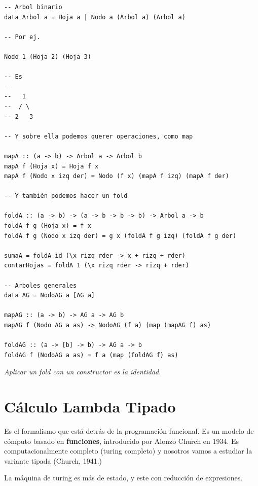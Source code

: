 \documentclass{report}
\theoremstyle{definition} %
\begin{document}
\begin{verbatim}
-- Arbol binario
data Arbol a = Hoja a | Nodo a (Arbol a) (Arbol a)

-- Por ej.

Nodo 1 (Hoja 2) (Hoja 3)

-- Es
--
--   1
--  / \
-- 2   3

-- Y sobre ella podemos querer operaciones, como map

mapA :: (a -> b) -> Arbol a -> Arbol b
mapA f (Hoja x) = Hoja f x
mapA f (Nodo x izq der) = Nodo (f x) (mapA f izq) (mapA f der)

-- Y también podemos hacer un fold

foldA :: (a -> b) -> (a -> b -> b -> b) -> Arbol a -> b
foldA f g (Hoja x) = f x
foldA f g (Nodo x izq der) = g x (foldA f g izq) (foldA f g der)

sumaA = foldA id (\x rizq rder -> x + rizq + rder)
contarHojas = foldA 1 (\x rizq rder -> rizq + rder)

-- Arboles generales
data AG = NodoAG a [AG a]

mapAG :: (a -> b) -> AG a -> AG b
mapAG f (Nodo AG a as) -> NodoAG (f a) (map (mapAG f) as)

foldAG :: (a -> [b] -> b) -> AG a -> b
foldAG f (NodoAG a as) = f a (map (foldAG f) as)
\end{verbatim}

\textit{Aplicar un fold con un constructor es la identidad}.

\section{Cálculo Lambda Tipado}

Es el formalismo que está detrás de la programación funcional. Es un modelo de
cómputo basado en \textbf{funciones}, introducido por Alonzo Church en 1934. Es
computacionalmente completo (turing completo) y nosotros vamos a estudiar la
variante tipada (Church, 1941.)

La máquina de turing es más de estado, y este con reducción de expresiones.
\end{document}

